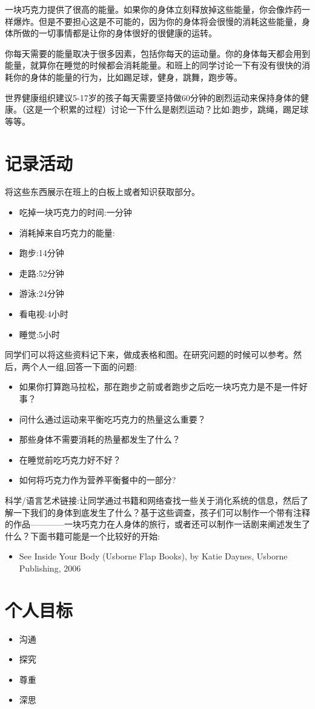    一块巧克力提供了很高的能量。如果你的身体立刻释放掉这些能量，你会像炸药一样爆炸。但是不要担心这是不可能的，因为你的身体将会很慢的消耗这些能量，身体所做的一切事情都是让你的身体很好的很健康的运转。\par
   你每天需要的能量取决于很多因素，包括你每天的运动量。你的身体每天都会用到能量，就算你在睡觉的时候都会消耗能量。和班上的同学讨论一下有没有很快的消耗你的身体的能量的行为，比如踢足球，健身，跳舞，跑步等。\par
   世界健康组织建议5-17岁的孩子每天需要坚持做60分钟的剧烈运动来保持身体的健康。（这是一个积累的过程）讨论一下什么是剧烈运动？比如:跑步，跳绳，踢足球等等。\par
   

\section{记录活动}
     将这些东西展示在班上的白板上或者知识获取部分。\par
     \begin{itemize}
       \item 吃掉一块巧克力的时间:一分钟
       \item 消耗掉来自巧克力的能量:
       \item 跑步:14分钟
       \item 走路:52分钟
       \item 游泳:24分钟
       \item 看电视:4小时
       \item 睡觉:5小时
     \end{itemize}  
     同学们可以将这些资料记下来，做成表格和图。在研究问题的时候可以参考。然后，两个人一组,回答一下面的问题:\par
     \begin{itemize}
       \item 如果你打算跑马拉松，那在跑步之前或者跑步之后吃一块巧克力是不是一件好事？
       \item 问什么通过运动来平衡吃巧克力的热量这么重要？
       \item 那些身体不需要消耗的热量都发生了什么？
       \item 在睡觉前吃巧克力好不好？
       \item 如何将巧克力作为营养平衡餐中的一部分?
     \end{itemize} 

     科学/语言艺术链接:让同学通过书籍和网络查找一些关于消化系统的信息，然后了解一下我们的身体到底发生了什么？基于这些调查，孩子们可以制作一个带有注释的作品————一块巧克力在人身体的旅行，或者还可以制作一话剧来阐述发生了什么？下面书籍可能是一个比较好的开始:\par
     \begin{itemize}
       \item See Inside Your Body (Usborne Flap Books), by Katie Daynes, Usborne Publishing, 2006
     \end{itemize}  
     


\section{个人目标}
   \begin{itemize}
     \item 沟通
     \item 探究
     \item 尊重
     \item 深思
   \end{itemize}  




